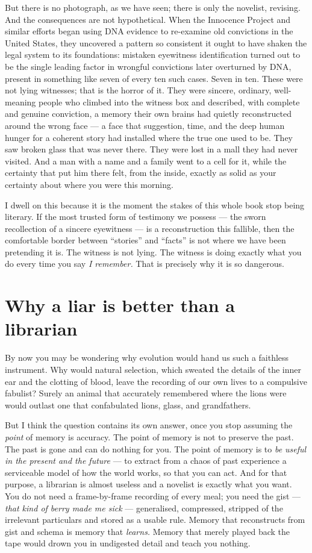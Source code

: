 But there is no photograph, as we have seen; there is only the novelist, revising. And the consequences are not hypothetical. When the Innocence Project and similar efforts began using DNA evidence to re-examine old convictions in the United States, they uncovered a pattern so consistent it ought to have shaken the legal system to its foundations: mistaken eyewitness identification turned out to be the single leading factor in wrongful convictions later overturned by DNA, present in something like seven of every ten such cases. Seven in ten. These were not lying witnesses; that is the horror of it. They were sincere, ordinary, well-meaning people who climbed into the witness box and described, with complete and genuine conviction, a memory their own brains had quietly reconstructed around the wrong face — a face that suggestion, time, and the deep human hunger for a coherent story had installed where the true one used to be. They saw broken glass that was never there. They were lost in a mall they had never visited. And a man with a name and a family went to a cell for it, while the certainty that put him there felt, from the inside, exactly as solid as your certainty about where you were this morning.

I dwell on this because it is the moment the stakes of this whole book stop being literary. If the most trusted form of testimony we possess — the sworn recollection of a sincere eyewitness — is a reconstruction this fallible, then the comfortable border between ``stories'' and ``facts'' is not where we have been pretending it is. The witness is not lying. The witness is doing exactly what you do every time you say \emph{I remember.} That is precisely why it is so dangerous.

\section*{Why a liar is better than a librarian}

By now you may be wondering why evolution would hand us such a faithless instrument. Why would natural selection, which sweated the details of the inner ear and the clotting of blood, leave the recording of our own lives to a compulsive fabulist? Surely an animal that accurately remembered where the lions were would outlast one that confabulated lions, glass, and grandfathers.

But I think the question contains its own answer, once you stop assuming the \emph{point} of memory is accuracy. The point of memory is not to preserve the past. The past is gone and can do nothing for you. The point of memory is to \emph{be useful in the present and the future} — to extract from a chaos of past experience a serviceable model of how the world works, so that you can act. And for that purpose, a librarian is almost useless and a novelist is exactly what you want. You do not need a frame-by-frame recording of every meal; you need the gist — \emph{that kind of berry made me sick} — generalised, compressed, stripped of the irrelevant particulars and stored as a usable rule. Memory that reconstructs from gist and schema is memory that \emph{learns.} Memory that merely played back the tape would drown you in undigested detail and teach you nothing.

